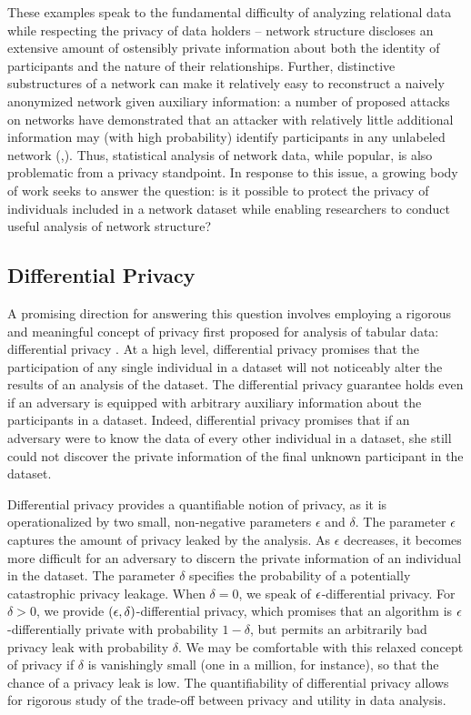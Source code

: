 These examples speak to the fundamental difficulty of analyzing relational data while respecting the privacy of data holders -- network structure discloses an extensive amount of ostensibly private information about both the identity of participants and the nature of their relationships. Further, distinctive substructures of a network can make it relatively easy to reconstruct a naively anonymized network given auxiliary information: a number of proposed attacks on networks have demonstrated that an attacker with relatively little additional information may (with high probability) identify participants in any unlabeled network (\cite{BDK11},\cite{NS09}). Thus, statistical analysis of network data, while popular, is also problematic from a privacy standpoint. In response to this issue, a growing body of work seeks to answer the question: is it possible to protect the privacy of individuals included in a network dataset while enabling researchers to conduct useful analysis of network structure?

\subsection{Differential Privacy}

A promising direction for answering this question involves employing a rigorous and meaningful concept of privacy first proposed for analysis of tabular data: differential privacy \cite{DMNS06}. At a high level, differential privacy promises that the participation of any single individual in a dataset will not noticeably alter the results of an analysis of the dataset. The differential privacy guarantee  holds even if an adversary is equipped with arbitrary auxiliary information about the participants in a dataset. Indeed, differential privacy promises that if an adversary were to know the data of every other individual in a dataset, she still could not discover the private information of the final unknown participant in the dataset. 

Differential privacy provides a quantifiable notion of privacy, as it is operationalized by two small, non-negative parameters $\epsilon$ and $\delta$. The parameter $\epsilon$ captures the amount of privacy leaked by the analysis. As $\epsilon$ decreases, it becomes more difficult for an adversary to discern the private information of an individual in the dataset. The parameter $\delta$ specifies the probability of a potentially catastrophic privacy leakage. When $\delta = 0$, we speak of $\epsilon$-differential privacy. For $\delta > 0$, we provide $(\epsilon, \delta)$-differential privacy, which promises that an algorithm is $\epsilon$-differentially private with probability $1-\delta$, but permits an arbitrarily bad privacy leak with probability $\delta$. We may be comfortable with this relaxed concept of privacy if $\delta$ is vanishingly small (one in a million, for instance), so that the chance of a privacy leak is low. The quantifiability of differential privacy allows for rigorous study of the trade-off between privacy and utility in data analysis.

